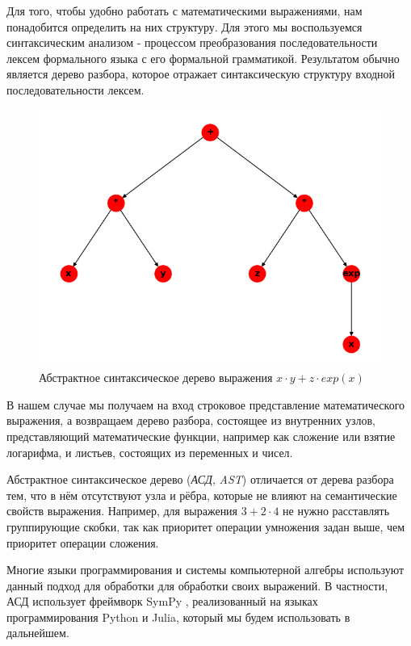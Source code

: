 Для того, чтобы удобно работать с математическими выражениями, нам понадобится определить на них структуру.
Для этого мы воспользуемся синтаксическим анализом - процессом преобразования последовательности лексем формального языка с его формальной грамматикой.
Результатом обычно является дерево разбора, которое отражает синтаксическую структуру входной последовательности лексем.

\begin{figure}[h!]
    \centering
    \includegraphics{chapters/images/AST.png}
    \caption{Абстрактное синтаксическое дерево выражения $x \cdot y + z \cdot exp(x)$}
    \label{fig:AST}
\end{figure}

В нашем случае мы получаем на вход строковое представление математического выражения, а возвращаем дерево разбора, состоящее из внутренних узлов, представляющий математические функции, например как сложение или взятие логарифма, и листьев, состоящих из переменных и чисел.

Абстрактное синтаксическое дерево (\textit{АСД}, \textit{AST}) отличается от дерева разбора тем, что в нём отсутствуют узла и рёбра, которые не влияют на семантические свойств выражения. Например, для выражения $3 + 2 \cdot 4$ не нужно расставлять группирующие скобки, так как приоритет операции умножения задан выше, чем приоритет операции сложения.

Многие языки программирования и системы компьютерной алгебры используют данный подход для обработки для обработки своих выражений. В частности, АСД использует фреймворк SymPy \cite{SymPy}, реализованный на языках программирования Python и Julia, который мы будем использовать в дальнейшем.


